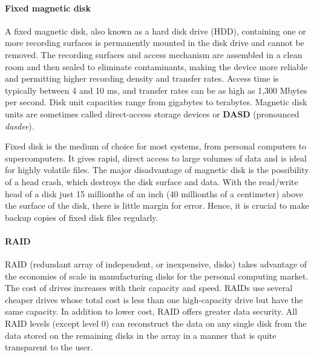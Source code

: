 \documentclass[
]{article}
\begin{document}
\hypertarget{fixed-magnetic-disk}{%
\paragraph*{Fixed magnetic disk}\label{fixed-magnetic-disk}}

A fixed magnetic disk, also known as a hard disk drive (HDD), containing
one or more recording surfaces is permanently mounted in the disk drive
and cannot be removed. The recording surfaces and access mechanism are
assembled in a clean room and then sealed to eliminate contaminants,
making the device more reliable and permitting higher recording density
and transfer rates. Access time is typically between 4 and 10 ms, and
transfer rates can be as high as 1,300 Mbytes per second. Disk unit
capacities range from gigabytes to terabytes. Magnetic disk units are
sometimes called direct-access storage devices or \textbf{DASD} (pronounced
\emph{dasdee}).

Fixed disk is the medium of choice for most systems, from personal
computers to supercomputers. It gives rapid, direct access to large
volumes of data and is ideal for highly volatile files. The major
disadvantage of magnetic disk is the possibility of a head crash, which
destroys the disk surface and data. With the read/write head of a disk
just 15 millionths of an inch (40 millionths of a centimeter) above the
surface of the disk, there is little margin for error. Hence, it is
crucial to make backup copies of fixed disk files regularly.

\hypertarget{raid}{%
\paragraph*{RAID}\label{raid}}

RAID (redundant array of independent, or inexpensive, disks) takes
advantage of the economies of scale in manufacturing disks for the
personal computing market. The cost of drives increases with their
capacity and speed. RAIDs use several cheaper drives whose total cost is
less than one high-capacity drive but have the same capacity. In
addition to lower cost, RAID offers greater data security. All RAID
levels (except level 0) can reconstruct the data on any single disk from
the data stored on the remaining disks in the array in a manner that is
quite transparent to the user.
\end{document}
